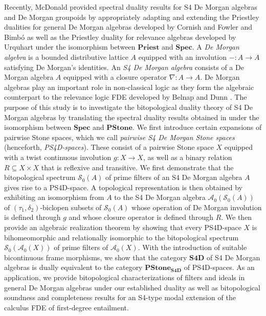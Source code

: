 \documentclass{amsart}
\theoremstyle{plain}
\theoremstyle{definition}
\begin{document}
Recently, McDonald \cite{mcdonald} provided spectral duality results for S4 De Morgan algebras and De Morgan groupoids by appropriately adapting and extending the Priestley dualities for general De Morgan algebras developed by Cornish and Fowler \cite{cornish1} and Bimb\'o \cite{bimbo} as well as the Priestley duality for relevance algebras developed by Urquhart \cite{urq} under the isomorphism between $\mathbf{Priest}$ and $\mathbf{Spec}$. A \emph{De Morgan algebra} is a bounded distributive lattice $A$ equipped with an involution $-\colon A\to A$ satisfying De Morgan's identities. An \emph{S4 De Morgan algebra} consists of a De Morgan algebra $A$ equipped with a closure operator $\nabla\colon A\to A$. De Morgan algebras play an important role in non-classical logic as they form the algebraic counterpart to the relevance logic FDE developed by Belnap and Dunn \cite{belnap,Dunn:SemanticsBD}. The purpose of this study is to investigate the bitopological duality theory of S4 De Morgan algebras by translating the spectral duality results obtained in \cite{mcdonald} under the isomorphism between $\mathbf{Spec}$ and $\mathbf{PStone}$. We first introduce certain expansions of pairwise Stone spaces, which we call \emph{pairwise S4 De Morgan Stone spaces} (henceforth, \emph{PS4D-spaces}). These consist of a pairwise Stone space $X$ equipped with a twist continuous involution $g\colon X\to X$, as well as a binary relation $R\subseteq X\times X$ that is reflexive and transitive. We first demonstrate that the bitopological spectrum $\mathcal{S}_0(A)$ of prime filters of an S4 De Morgan algebra $A$ gives rise to a PS4D-space. A topological representation is then obtained by exhibiting an isomorphism from $A$ to the S4 De Morgan algebra $\mathcal{A}_0(\mathcal{S}_0(A))$ of $(\tau_1,\delta_2)$-biclopen subsets of $\mathcal{S}_0(A)$ whose operation of De Morgan involution is defined through $g$ and whose closure operator is defined through $R$. We then provide an algebraic realization theorem by showing that every PS4D-space $X$ is bihomeomorphic and relationally isomorphic to the bitopological spectrum $\mathcal{S}_0(\mathcal{A}_0(X))$ of prime filters of $\mathcal{A}_0(X)$. With the introduction of suitable bicontinuous frame morphisms, we show that the category $\mathbf{S4D}$ of S4 De Morgan algebras is dually equivalent to the category $\mathbf{PStone_{S4D}}$ of PS4D-spaces. As an application, we provide bitopological characterizations of filters and ideals in general De Morgan algebras under our established duality as well as bitopological soundness and completeness results for an S4-type modal extension of the calculus FDE of first-degree entailment.      
\end{document}
